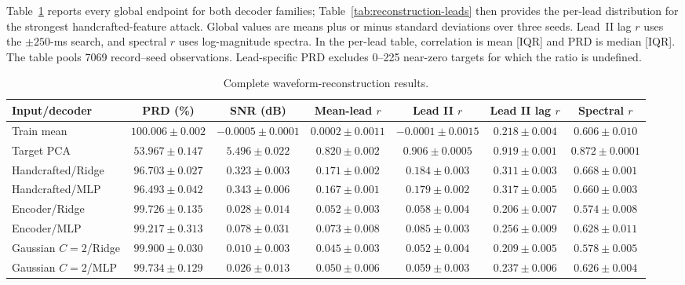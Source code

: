 \documentclass[journal]{IEEEtran}
\begin{document}
Table~\ref{tab:reconstruction-complete} reports every global endpoint for both
decoder families; Table~\ref{tab:reconstruction-leads} then provides the
per-lead distribution for the strongest handcrafted-feature attack. Global
values are means plus or minus standard deviations over three seeds. Lead~II
lag $r$ uses the $\pm250$-ms search, and spectral $r$ uses log-magnitude
spectra. In the per-lead table, correlation is mean [IQR] and PRD is median
[IQR]. The table pools 7069 record--seed observations. Lead-specific PRD
excludes 0--225 near-zero targets for which the ratio is undefined.

\begin{table}[ht]
\centering
\scriptsize
\setlength{\tabcolsep}{4pt}
\caption{Complete waveform-reconstruction results.}
\label{tab:reconstruction-complete}
\begin{tabular}{lcccccc}
\toprule
Input/decoder & PRD (\%) & SNR (dB) & Mean-lead $r$ & Lead II $r$ & Lead II lag $r$ & Spectral $r$ \\
\midrule
Train mean & $100.006\mathbin{\pm}0.002$ & $-0.0005\mathbin{\pm}0.0001$ & $0.0002\mathbin{\pm}0.0011$ & $-0.0001\mathbin{\pm}0.0015$ & $0.218\mathbin{\pm}0.004$ & $0.606\mathbin{\pm}0.010$ \\
Target PCA & $53.967\mathbin{\pm}0.147$ & $5.496\mathbin{\pm}0.022$ & $0.820\mathbin{\pm}0.002$ & $0.906\mathbin{\pm}0.0005$ & $0.919\mathbin{\pm}0.001$ & $0.872\mathbin{\pm}0.0001$ \\
Handcrafted/Ridge & $96.703\mathbin{\pm}0.027$ & $0.323\mathbin{\pm}0.003$ & $0.171\mathbin{\pm}0.002$ & $0.184\mathbin{\pm}0.003$ & $0.311\mathbin{\pm}0.003$ & $0.668\mathbin{\pm}0.001$ \\
Handcrafted/MLP & $96.493\mathbin{\pm}0.042$ & $0.343\mathbin{\pm}0.006$ & $0.167\mathbin{\pm}0.001$ & $0.179\mathbin{\pm}0.002$ & $0.317\mathbin{\pm}0.005$ & $0.660\mathbin{\pm}0.003$ \\
Encoder/Ridge & $99.726\mathbin{\pm}0.135$ & $0.028\mathbin{\pm}0.014$ & $0.052\mathbin{\pm}0.003$ & $0.058\mathbin{\pm}0.004$ & $0.206\mathbin{\pm}0.007$ & $0.574\mathbin{\pm}0.008$ \\
Encoder/MLP & $99.217\mathbin{\pm}0.313$ & $0.078\mathbin{\pm}0.031$ & $0.073\mathbin{\pm}0.008$ & $0.085\mathbin{\pm}0.003$ & $0.256\mathbin{\pm}0.009$ & $0.628\mathbin{\pm}0.011$ \\
Gaussian $C=2$/Ridge & $99.900\mathbin{\pm}0.030$ & $0.010\mathbin{\pm}0.003$ & $0.045\mathbin{\pm}0.003$ & $0.052\mathbin{\pm}0.004$ & $0.209\mathbin{\pm}0.005$ & $0.578\mathbin{\pm}0.005$ \\
Gaussian $C=2$/MLP & $99.734\mathbin{\pm}0.129$ & $0.026\mathbin{\pm}0.013$ & $0.050\mathbin{\pm}0.006$ & $0.059\mathbin{\pm}0.003$ & $0.237\mathbin{\pm}0.006$ & $0.626\mathbin{\pm}0.004$ \\
\bottomrule
\end{tabular}
\end{table}
\end{document}
